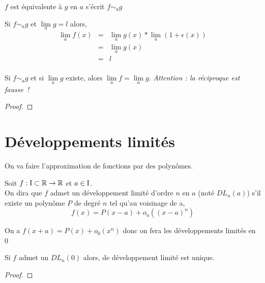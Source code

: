 \begin{nota}
$f$ est équivalente à $g$ en $a$ s'écrit $f\sim_{a}g$
\end{nota}
\begin{rem}
Si $f\sim_{a}g$ et $\lim\limits_ag=l$ alors,
\begin{eqnarray*}
		\lim\limits_a f(x) &=& \lim\limits_a g(x) *\lim\limits_a(1+\epsilon(x))\\
		& = & \lim\limits_a g(x)\\
		&=&l\\
\end{eqnarray*}
\end{rem}

\begin{propo}{}
Si $f\sim_ag$ et si $\lim\limits_ag$ existe, alors $\lim\limits_af=\lim\limits_ag$. \emph{Attention : la réciproque est fausse~!}
\end{propo}
\begin{proof}\end{proof}

\begin{expl}\end{expl}

\section{Développements limités}
\begin{idee}
On va faire l'approximation de fonctions par des polynômes.
\end{idee}
\begin{defi}
Soit $f:\text{I} \subset \mathbb{R} \to \mathbb{R}$ et $a\in \text{I}$.\\
On dira que $f$ admet un développement limité d'ordre $n$ en $a$ (noté $DL_n(a)$) s'il existe un polynôme $P$ de degré $n$ tel qu'au voisinage de a,
$$f(x) = P(x-a) + o_a((x-a)^n)$$
\end{defi}

\begin{rem}
On a $f(x+a) = P(x) + o_0(x^n)$ donc on fera les développements limités en 0
\end{rem}

\begin{prop}
Si $f$ admet un $DL_n(0)$ alors, de développement limité est unique.
\end{prop}

\begin{proof}\end{proof}

\begin{expl}\end{expl}

